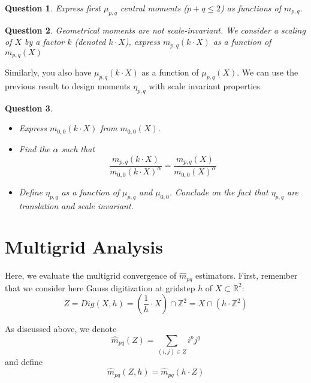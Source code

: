 \documentclass[a4paper, 11pt]{article}
\newtheorem{qu}{Question}
\begin{document}
\begin{qu}
 Express first $\mu_{p,q}$ central moments ($p+q\leq 2$) as functions of $m_{p,q}$.
\end{qu}


\begin{qu}
  Geometrical moments are not scale-invariant. We consider a
  scaling of $X$ by a factor $k$ (denoted $k\cdot X$), express
  $m_{p,q}(k\cdot X)$ as a function of $m_{p,q}(X)$
\end{qu}

\noindent Similarly, you also have $\mu_{p,q}(k\cdot X)$ as a function
of $\mu_{p,q}(X)$.  We can use the previous result to design moments
$\eta_{p,q}$ with scale invariant properties.

\begin{qu}
\begin{itemize}
\item Express $m_{0,0}(k\cdot X)$ from $m_{0,0}(X)$.
\item Find the $\alpha$ such that 
\begin{displaymath}
\frac{m_{p,q}(k\cdot X)}{m_{0,0}(k\cdot X)^\alpha} = \frac{m_{p,q}(X)}{m_{0,0}(X)^\alpha}
\end{displaymath}
\item Define $\eta_{p,q}$ as a function of $\mu_{p,q}$ and $\mu_{0,0}$. Conclude on the fact that $\eta_{p,q}$ are translation and scale invariant.
\end{itemize}
\end{qu}


\section{Multigrid Analysis}

Here, we evaluate the multigrid convergence of $\hat{m}_{pq}$
estimators. First, remember that we consider here Gauss digitization
at gridstep $h$ of $X\subset \mathbb{R}^2$:
\begin{displaymath}
  Z = Dig(X,h) = \left(\frac{1}{h}\cdot X\right)\cap \mathbb{Z}^2 = X\cap (h\cdot \mathbb{Z}^2)
\end{displaymath}




As discussed above, we denote
\begin{displaymath}
\hat{m}_{pq}(Z) = \sum_{(i,j)\in Z} i^pj^q
\end{displaymath}
and define 
\begin{displaymath}
\hat{m}_{pq}(Z,h) = \hat{m}_{pq}(h\cdot Z)
\end{displaymath}
\end{document}
